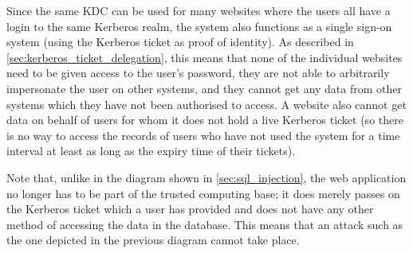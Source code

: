 \documentclass[12pt]{report}
\begin{document}
\begin{center}
\end{center}

Since the same KDC can be used for many websites where the users all have a login to the same Kerberos realm, the system also functions as a single sign-on system (using the Kerberos ticket as proof of identity). As described in \autoref{sec:kerberos_ticket_delegation}, this means that none of the individual websites need to be given access to the user's password, they are not able to arbitrarily impersonate the user on other systems, and they cannot get any data from other systems which they have not been authorised to access. A website also cannot get data on behalf of users for whom it does not hold a live Kerberos ticket (so there is no way to access the records of users who have not used the system for a time interval at least as long as the expiry time of their tickets).

Note that, unlike in the diagram shown in \autoref{sec:sql_injection}, the web application no longer has to be part of the trusted computing base; it does merely passes on the Kerberos ticket which a user has provided and does not have any other method of accessing the data in the database. This means that an attack such as the one depicted in the previous diagram cannot take place.
\end{document}
